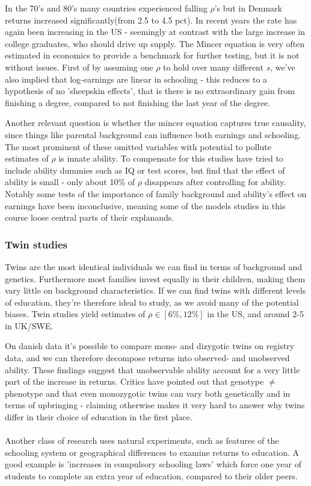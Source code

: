 \documentclass[12pt, a4paper]{article}
\begin{document}
\begin{multicols}{2}
In the 70's and 80's many countries experienced falling $\rho$'s but in Denmark returns increased significantly(from 2.5 to 4.5 pct). In recent years the rate has again been increasing in the US - seemingly at contrast with the large increase in college graduates, who should drive up supply. The Mincer equation is very often estimated in economics to provide a benchmark for further testing, but it is not without issues. First of by assuming one $\rho$ to hold over many different $s$, we've also implied that log-earnings are linear in schooling - this reduces to a hypothesis of no 'sheepskin effects', that is there is no extraordinary gain from finishing a degree, compared to not finishing the last year of the degree. 

Another relevant question is whether the mincer equation captures true causality, since things like parental background can influence both earnings and schooling. The most prominent of these omitted variables with potential to pollute estimates of $\rho$ is innate ability. To compensate for this studies have tried to include ability dummies such as IQ or test scores, but find that the effect of ability is small - only about 10\% of $\rho$ disappears after controlling for ability. Notably some tests of the importance of family background and ability's effect on earnings have been inconclusive, meaning some of the models studies in this course loose central parts of their explanands. 

\subsubsection{Twin studies}
Twins are the most identical individuals we can find in terms of background and genetics. Furthermore most families invest equally in their children, making them vary little on background characteristics. If we can find twins with different levels of education, they're therefore ideal to study, as we avoid many of the potential biases. Twin studies yield estimates of $\rho \in [6\%,12\%]$ in the US, and around 2-5 in UK/SWE. 

On danish data it's possible to compare mono- and dizygotic twins on registry data, and we can therefore decompose returns into observed- and unobserved ability. These findings suggest that unobservable ability account for a very little part of the increase in returns. Critics have pointed out that genotype $\neq$ phenotype and that even monozygotic twins can vary both genetically and in terms of upbringing - claiming otherwise makes it very hard to answer why twins differ in their choice of education in the first place.
\\ \\
Another class of research uses natural experiments, such as features of the schooling system or geographical differences to examine returns to education. A good example is 'increases in compulsory schooling laws' which force one year of students to complete an extra year of education, compared to their older peers. 


\end{multicols}
\end{document}
